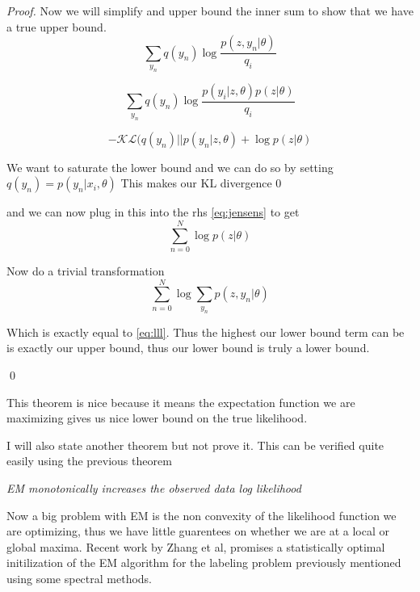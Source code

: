 \begin{theorem}
\begin{proof}
Now we will simplify and upper bound the inner sum to show that we have a true upper bound.
\begin{equation}
\displaystyle\sum\limits_{y_{n}} q(y_{n}) \log \frac{p(z,y_{n}| \theta)}{q_{i}}
\end{equation}

\begin{equation} 
\displaystyle\sum\limits_{y_{n}} q(y_{n}) \log \frac{p(y_{i}|z,\theta)p(z| \theta)}{q_{i}} 
\end{equation}

\begin{equation}
-\mathcal{KL}(q(y_{n}) || p(y_{n} | z, \theta) + \log p(z| \theta)
\end{equation}

We want to saturate the lower bound and we can do so by setting $q(y_{n}) = p(y_{n} | x_{i}, \theta)$ This makes our KL divergence 0

and we can now plug in this into the rhs \eqref{eq:jensens} to get
\begin{equation}
\displaystyle\sum\limits_{n=0}^{N} \log p(z | \theta)
\end{equation}

Now do a trivial transformation
\begin{equation}
\displaystyle\sum\limits_{n=0}^{N} \log \displaystyle\sum\limits_{y_{n}}  p(z,y_{n} | \theta)
\end{equation}

Which is exactly equal to \eqref{eq:lll}. Thus the highest our lower bound term can be is exactly our upper bound, thus our lower bound is truly a lower bound.

\qed
\end{proof}

\end{theorem}

This theorem is nice because it means the expectation function we are maximizing gives us nice lower bound on the true likelihood.


I will also state another theorem but not prove it. This can be verified quite easily using the previous theorem

\begin{theorem}
\emph{EM monotonically increases the observed data log likelihood}
\end{theorem}


Now a big problem with EM is the non convexity of the likelihood function we are optimizing, thus we have little guarentees on whether we are at a local or global maxima. Recent work by Zhang et al, promises a statistically optimal initilization of the EM algorithm for the labeling problem previously mentioned using some spectral methods.

